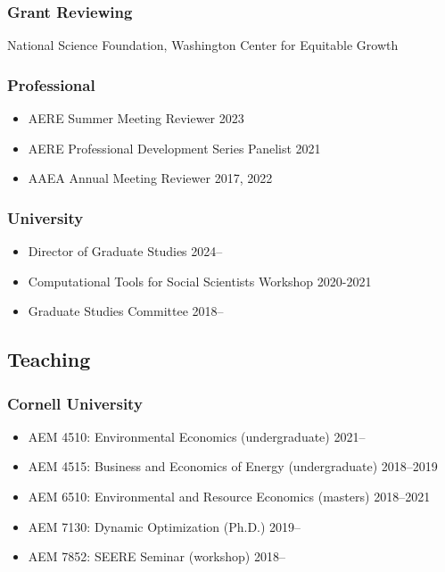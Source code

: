 \documentclass[12pt]{res} %
\begin{document}
\begin{resume}
\vspace{-.2in}

\subsubsection{Grant Reviewing} 

\vspace{-.2in}

National Science Foundation, Washington Center for Equitable Growth

\vspace{-.2in}


\subsubsection{Professional}
\begin{itemize} \itemsep -1pt
	\item[] AERE Summer Meeting Reviewer \hfill 2023
	\item[]	AERE Professional Development Series Panelist \hfill 2021
	\item[] AAEA Annual Meeting Reviewer \hfill 2017, 2022
\end{itemize}


\vspace{-.2in}

\subsubsection{University}
\begin{itemize} \itemsep -1pt
	\item[] Director of Graduate Studies \hfill 2024--
	\item[] Computational Tools for Social Scientists Workshop \hfill 2020-2021
	\item[]	Graduate Studies Committee \hfill 2018--
\end{itemize}

\vspace{-.2in}

\subsection{Teaching}\vspace{-.2in}
\subsubsection{Cornell University}
\begin{itemize} \itemsep -1pt
	\item[] AEM 4510: Environmental Economics (undergraduate) \hfill 2021--
	\item[] AEM 4515: Business and Economics of Energy (undergraduate) \hfill 2018--2019
	\item[] AEM 6510: Environmental and Resource Economics (masters) \hfill 2018--2021
	\item[] AEM 7130: Dynamic Optimization (Ph.D.) \hfill 2019--
	\item[] AEM 7852: SEERE Seminar (workshop) \hfill 2018--
\end{itemize}\vspace{-.3in}

\end{resume}
\end{document}
